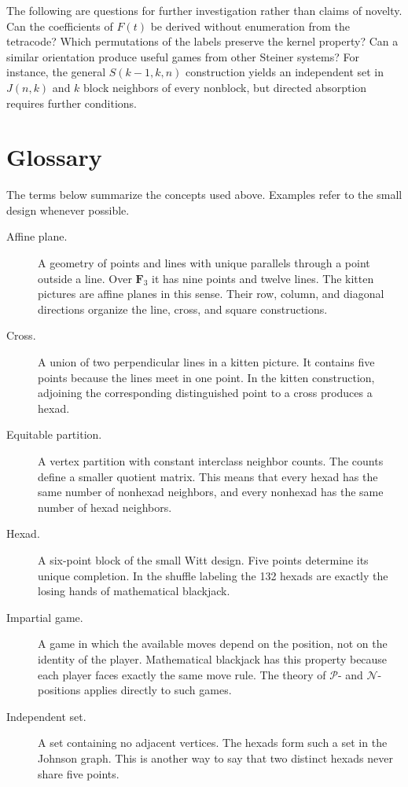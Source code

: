 \documentclass[12pt,letterpaper]{article}
\theoremstyle{definition}\newtheorem{example}[theorem]{Example}
\numberwithin{equation}{section}
\newcommand{\F}{\mathbf F}
\begin{document}
The following are questions for further investigation rather than claims of novelty. Can the coefficients of $F(t)$ be derived without enumeration from the tetracode? Which permutations of the labels preserve the kernel property? Can a similar orientation produce useful games from other Steiner systems? For instance, the general $S(k-1,k,n)$ construction yields an independent set in $J(n,k)$ and $k$ block neighbors of every nonblock, but directed absorption requires further conditions.

\section{Glossary}
The terms below summarize the concepts used above. Examples refer to the small design whenever possible.
\begin{description}
\item[Affine plane.] A geometry of points and lines with unique parallels through a point outside a line. Over $\F_3$ it has nine points and twelve lines. The kitten pictures are affine planes in this sense. Their row, column, and diagonal directions organize the line, cross, and square constructions.

\item[Cross.] A union of two perpendicular lines in a kitten picture. It contains five points because the lines meet in one point. In the kitten construction, adjoining the corresponding distinguished point to a cross produces a hexad.

\item[Equitable partition.] A vertex partition with constant interclass neighbor counts. The counts define a smaller quotient matrix. This means that every hexad has the same number of nonhexad neighbors, and every nonhexad has the same number of hexad neighbors.

\item[Hexad.] A six-point block of the small Witt design. Five points determine its unique completion. In the shuffle labeling the 132 hexads are exactly the losing hands of mathematical blackjack.

\item[Impartial game.] A game in which the available moves depend on the position, not on the identity of the player. Mathematical blackjack has this property because each player faces exactly the same move rule. The theory of $\mathcal P$- and $\mathcal N$-positions applies directly to such games.

\item[Independent set.] A set containing no adjacent vertices. The hexads form such a set in the Johnson graph. This is another way to say that two distinct hexads never share five points.


\end{description}
\end{document}
